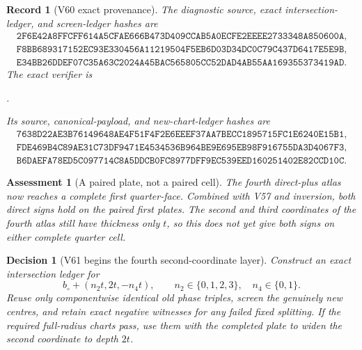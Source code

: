 \documentclass[11pt,oneside]{article}
\newtheorem{assessment}[theorem]{Assessment}
\newtheorem{record}[theorem]{Record}
\newtheorem{decision}[theorem]{Decision}
\theoremstyle{definition}
\theoremstyle{remark}
\begin{document}
\begin{record}[V60 exact provenance]
\label{rec:newv60-provenance}
The diagnostic source, exact intersection-ledger, and screen-ledger
hashes are
\[
\begin{gathered}
\texttt{2F6E42A8FFCFF614A5CFAE666B473D409CCAB5A0ECFE2EEEE2733348A850600A},\\
\texttt{F8BB689317152EC93E330456A11219504F5EB6D03D34DC0C79C437D6417E5E9B},\\
\texttt{E34BB26DDEF07C35A63C2024A45BAC565805CC52DAD4AB55AA169355373419AD}.
\end{gathered}                                        \tag{60.13}
\]
The exact verifier is
\begin{center}
\footnotesize
{}.
\end{center}
Its source, canonical-payload, and new-chart-ledger hashes are
\[
\begin{gathered}
\texttt{7638D22AE3B76149648AE4F51F4F2E6EEEF37AA7BECC1895715FC1E6240E15B1},\\
\texttt{FDE469B4C89AE31C73DF9471E4534536B964BE9E695EB98F916755DA3D4067F3},\\
\texttt{B6DAEFA78ED5C097714C8A5DDCB0FC8977DFF9EC539EED160251402E82CCD10C}.
\end{gathered}                                        \tag{60.14}
\]
\end{record}

\begin{assessment}[A paired plate, not a paired cell]
\label{ass:newv60}
The fourth direct-plus atlas now reaches a complete first
quarter-face.  Combined with V57 and inversion, both direct signs
hold on the paired first plates.  The second and third coordinates
of the fourth atlas still have thickness only \(t\), so this does
not yet give both signs on either complete quarter cell.
\end{assessment}

\begin{decision}[V61 begins the fourth second-coordinate layer]
\label{dec:newv60-next}
Construct an exact intersection ledger for
\[
 b_\circ+(n_2t,2t,-n_4t),\qquad
 n_2\in\{0,1,2,3\},\quad n_4\in\{0,1\}.              \tag{60.15}
\]
Reuse only componentwise identical old phase triples, screen the
genuinely new centres, and retain exact negative witnesses for any
failed fixed splitting.  If the required full-radius charts pass,
use them with the completed plate to widen the second coordinate
to depth \(2t\).
\end{decision}
\end{document}
